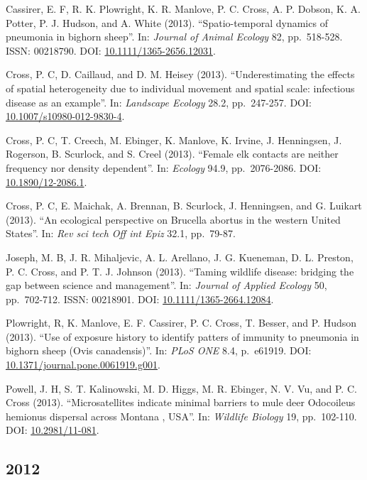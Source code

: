 \documentclass[12pt,]{article}
\begin{document}
Cassirer, E. F, R. K. Plowright, K. R. Manlove, P. C. Cross, A. P.
Dobson, K. A. Potter, P. J. Hudson, and A. White (2013).
``Spatio-temporal dynamics of pneumonia in bighorn sheep''. In:
\emph{Journal of Animal Ecology} 82, pp.~518-528. ISSN: 00218790. DOI:
\href{https://doi.org/10.1111\%2F1365-2656.12031}{10.1111/1365-2656.12031}.

Cross, P. C, D. Caillaud, and D. M. Heisey (2013). ``Underestimating the
effects of spatial heterogeneity due to individual movement and spatial
scale: infectious disease as an example''. In: \emph{Landscape Ecology}
28.2, pp.~247-257. DOI:
\href{https://doi.org/10.1007\%2Fs10980-012-9830-4}{10.1007/s10980-012-9830-4}.

Cross, P. C, T. Creech, M. Ebinger, K. Manlove, K. Irvine, J.
Henningsen, J. Rogerson, B. Scurlock, and S. Creel (2013). ``Female elk
contacts are neither frequency nor density dependent''. In:
\emph{Ecology} 94.9, pp.~2076-2086. DOI:
\href{https://doi.org/10.1890\%2F12-2086.1}{10.1890/12-2086.1}.

Cross, P. C, E. Maichak, A. Brennan, B. Scurlock, J. Henningsen, and G.
Luikart (2013). ``An ecological perspective on Brucella abortus in the
western United States''. In: \emph{Rev sci tech Off int Epiz} 32.1,
pp.~79-87.

Joseph, M. B, J. R. Mihaljevic, A. L. Arellano, J. G. Kueneman, D. L.
Preston, P. C. Cross, and P. T. J. Johnson (2013). ``Taming wildlife
disease: bridging the gap between science and management''. In:
\emph{Journal of Applied Ecology} 50, pp.~702-712. ISSN: 00218901. DOI:
\href{https://doi.org/10.1111\%2F1365-2664.12084}{10.1111/1365-2664.12084}.

Plowright, R, K. Manlove, E. F. Cassirer, P. C. Cross, T. Besser, and P.
Hudson (2013). ``Use of exposure history to identify patters of immunity
to pneumonia in bighorn sheep (Ovis canadensis)''. In: \emph{PLoS ONE}
8.4, p.~e61919. DOI:
\href{https://doi.org/10.1371\%2Fjournal.pone.0061919.g001}{10.1371/journal.pone.0061919.g001}.

Powell, J. H, S. T. Kalinowski, M. D. Higgs, M. R. Ebinger, N. V. Vu,
and P. C. Cross (2013). ``Microsatellites indicate minimal barriers to
mule deer Odocoileus hemionus dispersal across Montana , USA''. In:
\emph{Wildlife Biology} 19, pp.~102-110. DOI:
\href{https://doi.org/10.2981\%2F11-081}{10.2981/11-081}.

\hypertarget{section-7}{%
\subsection{2012}\label{section-7}}
\end{document}
